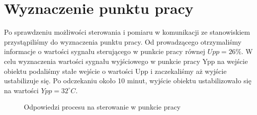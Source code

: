 \chapter{Wyznaczenie punktu pracy}
Po sprawdzeniu możliwości sterowania i pomiaru w komunikacji ze stanowiskiem
przystąpiliśmy do wyznaczenia punktu pracy. Od prowadzącego otrzymaliśmy
informacje o wartości sygnału sterującego w punkcie pracy równej
$Upp = 26\%$. W celu wyznaczenia wartości sygnału wyjściowego w punkcie pracy
Ypp na wejście obiektu podaliśmy stałe wejście o wartości Upp i zaczekaliśmy aż
wyjście ustabilizuje się. Po odczekaniu około 10 minut, wyjście obiektu ustabilizowało
się na wartości $ Ypp = 32^{\circ} C$.

\begin{figure}[b]
    \centering
    \caption{Odpowiedzi procesu na sterowanie w punkcie pracy}
    \label{lab1_odpowiedzi_rys}
\end{figure}